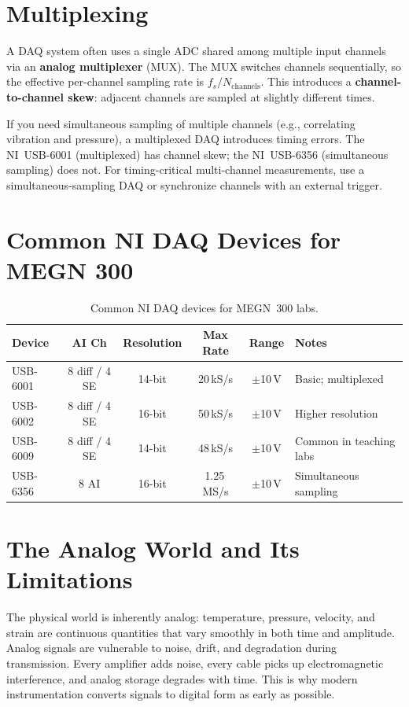 \documentclass[11pt,letterpaper,twoside,openany]{book}
\begin{document}
\section{Multiplexing}
A DAQ system often uses a single ADC shared among multiple input channels via an \textbf{analog multiplexer} (MUX). The MUX switches channels sequentially, so the effective per-channel sampling rate is $f_s / N_{\text{channels}}$. This introduces a \textbf{channel-to-channel skew}: adjacent channels are sampled at slightly different times.

\begin{warningbox}
If you need simultaneous sampling of multiple channels (e.g., correlating vibration and pressure), a multiplexed DAQ introduces timing errors. The NI~USB-6001 (multiplexed) has channel skew; the NI~USB-6356 (simultaneous sampling) does not. For timing-critical multi-channel measurements, use a simultaneous-sampling DAQ or synchronize channels with an external trigger.
\end{warningbox}

\section{Common NI DAQ Devices for MEGN 300}
\begin{table}[htbp]\centering\small
\begin{tabularx}{\textwidth}{l c c c c X}
\toprule
\textbf{Device} & \textbf{AI Ch} & \textbf{Resolution} & \textbf{Max Rate} & \textbf{Range} & \textbf{Notes} \\
\midrule
USB-6001 & 8 diff / 4 SE & 14-bit & 20\,kS/s & $\pm$10\,V & Basic; multiplexed \\
USB-6002 & 8 diff / 4 SE & 16-bit & 50\,kS/s & $\pm$10\,V & Higher resolution \\
USB-6009 & 8 diff / 4 SE & 14-bit & 48\,kS/s & $\pm$10\,V & Common in teaching labs \\
USB-6356 & 8 AI & 16-bit & 1.25\,MS/s & $\pm$10\,V & Simultaneous sampling \\
\bottomrule
\end{tabularx}
\caption{Common NI DAQ devices for MEGN~300 labs.}
\end{table}


\section{The Analog World and Its Limitations}
The physical world is inherently analog: temperature, pressure, velocity, and strain are continuous quantities that vary smoothly in both time and amplitude. Analog signals are vulnerable to noise, drift, and degradation during transmission. Every amplifier adds noise, every cable picks up electromagnetic interference, and analog storage degrades with time. This is why modern instrumentation converts signals to digital form as early as possible.
\end{document}
